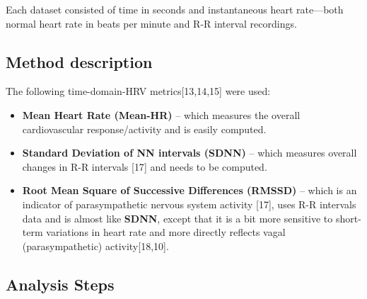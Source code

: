 \documentclass[
  11pt,
]{ieee}
\begin{document}
Each dataset consisted of time in seconds and instantaneous heart
rate---both normal heart rate in beats per minute and R-R interval
recordings.

\subsection{Method description}\label{method-description}

\vspace{0.8em}

The following time-domain-HRV metrics{[}13,14,15{]} were used:

\begin{itemize}
\item
  \textbf{Mean Heart Rate (Mean-HR)} -- which measures the overall
  cardiovascular response/activity and is easily computed.
\item
  \textbf{Standard Deviation of NN intervals (SDNN)} -- which measures
  overall changes in R-R intervals {[}17{]} and needs to be computed.
\item
  \textbf{Root Mean Square of Successive Differences (RMSSD)} -- which
  is an indicator of parasympathetic nervous system activity {[}17{]},
  uses R-R intervals data and is almost like \textbf{SDNN}, except that
  it is a bit more sensitive to short-term variations in heart rate and
  more directly reflects vagal (parasympathetic) activity{[}18,10{]}.
\end{itemize}

\subsection{Analysis Steps}\label{analysis-steps}

\vspace{0.8em}
\end{document}
